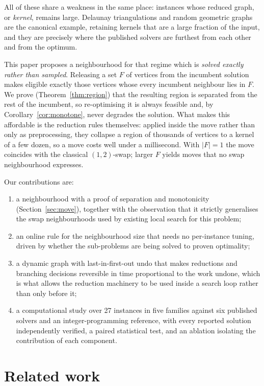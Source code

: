 \documentclass[preprint,12pt]{elsarticle}
\theoremstyle{definition}
\begin{document}
All of these share a weakness in the same place: instances whose reduced graph,
or \emph{kernel}, remains large. Delaunay triangulations and random geometric
graphs are the canonical example, retaining kernels that are a large fraction of
the input, and they are precisely where the published solvers are furthest from
each other and from the optimum.

This paper proposes a neighbourhood for that regime which is \emph{solved
exactly rather than sampled}. Releasing a set $F$ of vertices from the incumbent
solution makes eligible exactly those vertices whose every incumbent neighbour
lies in $F$. We prove (Theorem~\ref{thm:region}) that the resulting region is
separated from the rest of the incumbent, so re-optimising it is always feasible
and, by Corollary~\ref{cor:monotone}, never degrades the solution. What makes
this affordable is the reduction rules themselves: applied inside the move
rather than only as preprocessing, they collapse a region of thousands of
vertices to a kernel of a few dozen, so a move costs well under a millisecond.
With $|F|=1$ the move coincides with the classical $(1,2)$-swap; larger $F$ yields
moves that no swap neighbourhood expresses.

Our contributions are:
\begin{enumerate}
\item a neighbourhood with a proof of separation and monotonicity
      (Section~\ref{sec:move}), together with the observation that it
      strictly generalises the swap neighbourhoods used by existing local
      search for this problem;
\item an online rule for the neighbourhood size that needs no per-instance
      tuning, driven by whether the sub-problems are being solved to proven
      optimality;
\item a dynamic graph with last-in-first-out undo that makes reductions and
      branching decisions reversible in time proportional to the work undone,
      which is what allows the reduction machinery to be used inside a search
      loop rather than only before it;
\item a computational study over 27 instances in five families against six
      published solvers and an integer-programming reference, with every
      reported solution independently verified, a paired statistical test, and
      an ablation isolating the contribution of each component.
\end{enumerate}

\section{Related work}
\label{sec:related}
\end{document}
